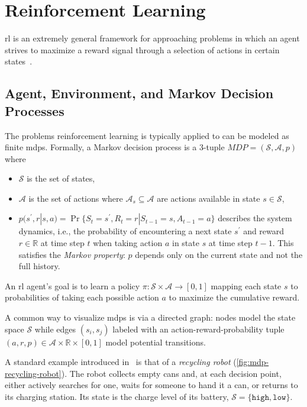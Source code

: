 
\section{Reinforcement Learning}\label{sec:reinforcement-learning}

\Gls{rl} is an extremely general framework for approaching problems
in which an agent strives to maximize a reward signal through a selection of actions
in certain states~\cite{sutton_reinforcement_2020}.

\subsection{Agent, Environment, and Markov Decision Processes}\label{sec:rl-mdp}

The problems reinforcement learning is typically applied to can be modeled as
finite \glspl{mdp}. Formally, a Markov decision process is
a 3-tuple $\mathit{MDP}=(\mathcal{S},\mathcal{A},p)$ where

\begin{itemize}
  \item $\mathcal{S}$ is the set of states,
  \item $\mathcal{A}$ is the set of actions where $\mathcal{A}_s\subseteq\mathcal{A}$ are actions available in state $s\in\mathcal{S}$,
  \item $p(s^\prime,r|s,a)=\Pr\{S_t=s^\prime, R_t=r|S_{t-1}=s, A_{t-1}=a\}$
    describes the system dynamics, i.e., the probability of encountering a next
    state $s^\prime$ and reward $r\in\mathbb{R}$ at time step $t$ when taking action $a$ in
    state $s$ at time step $t-1$. This satisfies the \emph{Markov property}:
    $p$ depends only on the current state and not the full history.
\end{itemize}

An \gls{rl} agent's goal is to learn a policy $\pi:\mathcal{S}\times\mathcal{A}\rightarrow [0,1]$
mapping each state $s$ to probabilities of taking each possible action $a$ to maximize
the cumulative reward.

A common way to visualize \glspl{mdp} is via a directed graph: nodes model the state
space $\mathcal{S}$ while edges $(s_i,s_j)$ labeled with an action-reward-probability
tuple $(a,r,p)\in\mathcal{A}\times\mathbb{R}\times[0,1]$ model potential
transitions.

A standard example introduced in~\textcite{sutton_reinforcement_2020} is that of a \emph{recycling robot} (\cref{fig:mdp-recycling-robot}).
The robot collects empty cans and, at each decision point, either actively searches
for one, waits for someone to hand it a can, or returns to its charging station.
Its state is the charge level of its battery, $\mathcal{S}=\{\mathtt{high},\mathtt{low}\}$.

